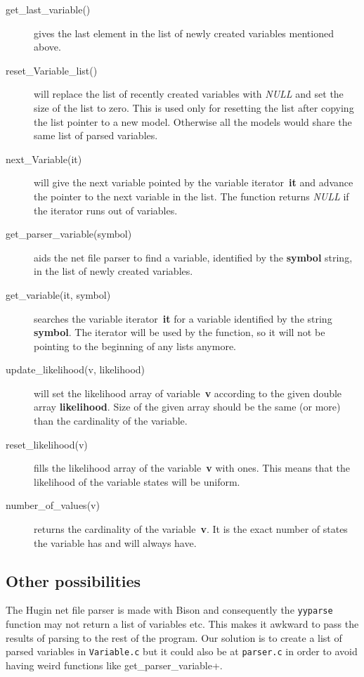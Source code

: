 \documentclass[12pt,a4paper]{report}
\begin{document}
\begin{description}
\item[get\_last\_variable()] gives the last element in the list
of newly created variables mentioned above.

\item[reset\_Variable\_list()] will replace the list of recently created
variables with {\it NULL} and set the size of the list to zero. This
is used only for resetting the list after copying the list pointer
to a new model. Otherwise all the models would share the same list of
parsed variables.

\item[next\_Variable(it)] will give the next variable pointed by the
variable iterator~\textbf{it} and advance the pointer to the next
variable in the list. The function returns {\it NULL} if the iterator
runs out of variables.

\item[get\_parser\_variable(symbol)] aids the net file parser to find a
variable, identified by the \textbf{symbol} string, in the list of newly
created variables.

\item[get\_variable(it, symbol)] searches the
variable iterator~\textbf{it} for a variable identified by the string
\textbf{symbol}. The iterator will be used by the function, so it will
not be pointing to the beginning of any lists anymore.

\item[update\_likelihood(v, likelihood)] will set the likelihood array
of variable~\textbf{v} according to the given double array 
\textbf{likelihood}. Size of the given array should be the same 
(or more) than the cardinality of the variable.

\item[reset\_likelihood(v)] fills the likelihood array of the
variable~\textbf{v} with ones. This means that the likelihood of the
variable states will be uniform.

\item[number\_of\_values(v)] returns the cardinality of the
variable~\textbf{v}. It is the exact number of states the variable has
and will always have.
\end{description}


\subsection{Other possibilities}
The Hugin net file parser is made with Bison and consequently the 
\verb+yyparse+ function may not return a list of variables etc. This 
makes it awkward to pass the results of parsing to the rest of the
program. Our solution is to create a list of parsed variables in
\verb+Variable.c+ but it could also be at \verb+parser.c+ in order to
avoid having weird functions like \+get_parser_variable+.
\end{document}
